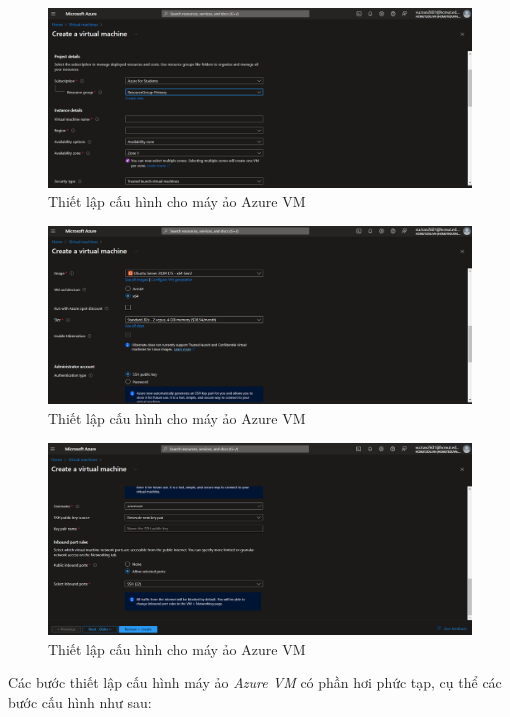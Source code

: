 \begin{figure}[H]
    \centering
    \includegraphics[width=1\textwidth]{Images/Deployment/HybridSearch/Config1.png}
    \caption{Thiết lập cấu hình cho máy ảo Azure VM}
\end{figure}
\begin{figure}[H]
    \centering
    \includegraphics[width=1\textwidth]{Images/Deployment/HybridSearch/Config2.png}
    \caption{Thiết lập cấu hình cho máy ảo Azure VM}
\end{figure}
\begin{figure}[H]
    \centering
    \includegraphics[width=1\textwidth]{Images/Deployment/HybridSearch/Config3.png}
    \caption{Thiết lập cấu hình cho máy ảo Azure VM}
\end{figure}
\hspace*{1cm}
Các bước thiết lập cấu hình máy ảo \textit{Azure VM} có phần hơi phức tạp, cụ thể các bước cấu hình như sau:
